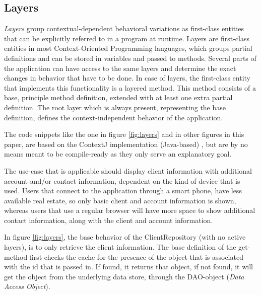 \documentclass{acm_proc_article-sp}
\begin{document}
\subsection{Layers}
\label{sec:layers}
\textit{Layers} group contextual-dependent behavioral variations as first-class entities that can be explicitly referred to in a program at runtime. Layers are first-class entities in most Context-Oriented Programming languages, which groups partial definitions and can be stored in variables and passed to methods. Several parts of the application can have access to the same layers and determine the exact changes in behavior that have to be done. In case of layers, the first-class entity that implements this functionality is a layered method. This method consists of a base, principle method definition, extended with at least one extra partial definition. The root layer which is always present, representing the base definition, defines the context-independent behavior of the application.

The code snippets like the one in figure \ref{fig:layers} and in other figures in this paper, are based on the ContextJ implementation (Java-based) \cite{Appeltauer:2009:IDC:1562112.1562117}, but are by no means meant to be compile-ready as they only serve an explanatory goal. 

The use-case that is applicable should display client information with additional account and/or contact information, dependent on the kind of device that is used. Users that connect to the application through a smart phone, have less available real estate, so only basic client and account information is shown, whereas users that use a regular browser will have more space to show additional contact information, along with the client and account information. 

In figure \ref{fig:layers}, the base behavior of the ClientRepository (with no active layers), is to only retrieve the client information. The base definition of the get-method first checks the cache for the presence of the object that is associated with the id that is passed in. If found, it returns that object, if not found, it will get the object from the underlying data store, through the DAO-object (\textit{Data Access Object}). 
\end{document}
